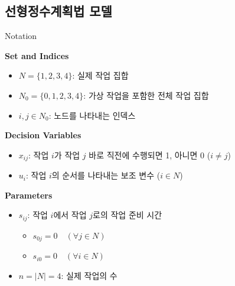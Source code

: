 \documentclass[10pt]{article}
\begin{document}
\subsection{선형정수계획법 모델}
\begin{stabilitybox}{Notation}
    \begin{minipage}[t]{0.58\linewidth}
        \textbf{Set and Indices}
        \begin{itemize}
            \item $N = \{1, 2, 3, 4\}$: 실제 작업 집합
            \item $N_0 = \{0, 1, 2, 3, 4\}$: 가상 작업을 포함한 전체 작업 집합
            \item $i, j \in N_0$: 노드를 나타내는 인덱스
        \end{itemize}
        \textbf{Decision Variables}
        \begin{itemize}
            \item $x_{ij}$: 작업 $i$가 작업 $j$ 바로 직전에 수행되면 1, 아니면 0 ($i \ne j$)
            \item $u_i$: 작업 $i$의 순서를 나타내는 보조 변수 ($i \in N$)
        \end{itemize}
    \end{minipage}
    \hfill
    \begin{minipage}[t]{0.4\linewidth}
        \textbf{Parameters}
        \begin{itemize}
            \item $s_{ij}$: 작업 $i$에서 작업 $j$로의 작업 준비 시간
            \begin{itemize}
                \item $s_{0j} = 0 \quad (\forall j \in N)$
                \item $s_{i0} = 0 \quad (\forall i \in N)$
            \end{itemize}
            \item $n = |N| = 4$: 실제 작업의 수
        \end{itemize}
    \end{minipage}
\end{stabilitybox}
\end{document}
